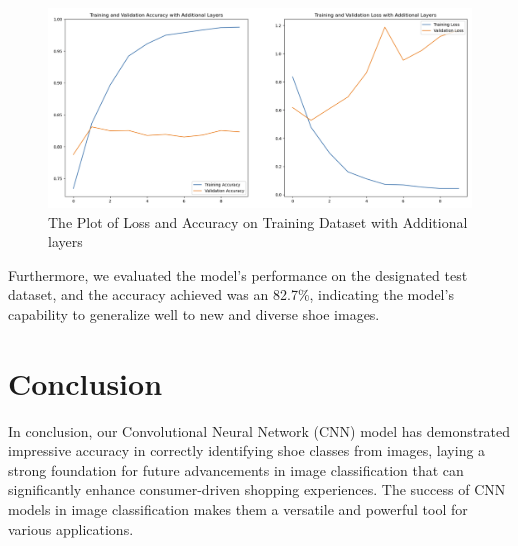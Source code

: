 \documentclass[11pt,a4paper]{article}
\begin{document}
 \begin{figure}[h!]
 \centering
  \includegraphics[width=\linewidth]{Model with Additional Layers.png}
  \caption{The Plot of Loss and Accuracy on Training Dataset with Additional layers}
  \label{refined_model_training}
\end{figure}
\FloatBarrier

\begin{table}[h!]
\centering
{}
\caption{Result of Model Training and Validation Accuracy After Additional Layers with Epochs}
\label{tab:refined_train_loss}
\end{table}

Furthermore, we evaluated the model's performance on the designated test dataset, and the accuracy achieved was an 82.7\%, indicating the model's capability to generalize well to new and diverse shoe images.

\section{Conclusion}
In conclusion, our Convolutional Neural Network (CNN) model has demonstrated impressive accuracy in correctly identifying shoe classes from images, laying a strong foundation for future advancements in image classification that can significantly enhance consumer-driven shopping experiences. The success of CNN models in image classification makes them a versatile and powerful tool for various applications.
\end{document}
